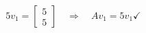 \documentclass{article}
\begin{document}
\begin{align*}
5v_1 = \begin{bmatrix}5\\5\end{bmatrix}\quad \Rightarrow \quad \boxed{Av_1 = 5v_1} \checkmark
\end{align*}
\end{document}
